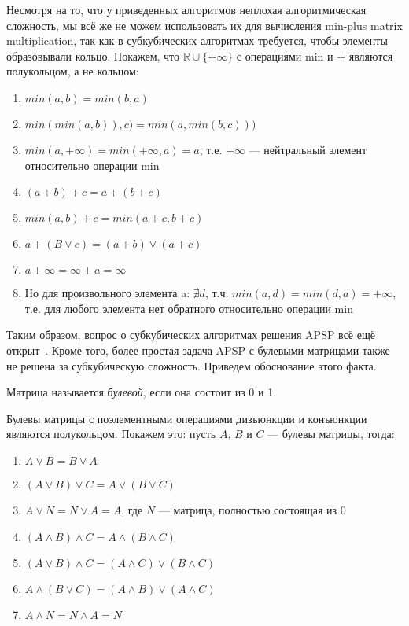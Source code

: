 Несмотря на то, что у приведенных алгоритмов неплохая алгоритмическая сложность, мы всё же не можем использовать их для вычисления min-plus matrix multiplication, так как в субкубических алгоритмах требуется, чтобы элементы образовывали кольцо. Покажем, что $\mathbb{R} \cup \{+\infty\}$ с операциями min и + являются полукольцом, а не кольцом:
\begin{enumerate}
    \item $min(a, b) = min(b, a)$
    \item $min(min(a, b)), c) = min(a, min(b, c)))$
    \item $min(a, +\infty) = min(+\infty, a) = a$, т.е. $+\infty$ --- нейтральный элемент относительно операции min
    
    \item $(a + b) + c = a + (b + c)$
    
    \item $min(a, b) + c = min(a + c, b + c)$
    \item $a + (B \vee c) = (a + b) \vee (a + c)$
    
    \item $a + \infty = \infty + a = \infty$
    \item Но для произвольного элемента a: $\nexists d$, т.ч. $min(a, d) = min(d, a) = +\infty$, т.е. для любого элемента нет обратного относительно операции min
\end{enumerate}

Таким образом, вопрос о субкубических алгоритмах решения APSP всё ещё открыт~\cite{Chan2010}.
Кроме того, более простая задача APSP с булевыми матрицами также не решена за субкубическую сложность. Приведем обоснование этого факта.

\begin{definition}
  Матрица называется \textit{булевой}, если она состоит из 0 и 1.
\end{definition}

Булевы матрицы с поэлементными операциями дизъюнкции и конъюнкции являются полукольцом. Покажем это: пусть $A$, $B$ и $C$ --- булевы матрицы, тогда:
\begin{enumerate}
    \item $A \vee B = B \vee A$
    \item $(A \vee B) \vee C = A \vee (B \vee C)$
    \item $A \vee N = N \vee A = A$, где $N$ --- матрица, полностью состоящая из 0
    
    \item $(A \wedge B) \wedge C = A \wedge (B \wedge C)$
    
    \item $(A \vee B) \wedge C = (A \wedge C) \vee (B \wedge C)$
    \item $A \wedge (B \vee C) = (A \wedge B) \vee (A \wedge C)$
    
    \item $A \wedge N = N \wedge A = N$
\end{enumerate}

